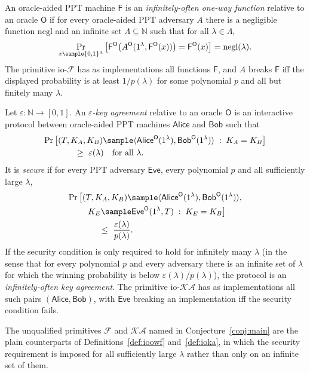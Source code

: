 \documentclass{conjura-conjecture}
\newcommand{\bits}{\{0,1\}}
\newcommand{\negl}{\mathrm{negl}}
\newcommand{\iopref}{\mathrm{io}\text{-}}
\newcommand{\Fc}{\mathcal{F}}
\newcommand{\KAc}{\mathcal{KA}}
\newcommand{\ioF}{\iopref\Fc}
\newcommand{\ioKA}{\iopref\KAc}
\newcommand{\Oc}{\mathsf{O}}
\newcommand{\Fs}{\mathsf{F}}
\newcommand{\Alice}{\mathsf{Alice}}
\newcommand{\Bob}{\mathsf{Bob}}
\newcommand{\Eve}{\mathsf{Eve}}
\newcommand{\FO}{\Fs^{\Oc}}
\newcommand{\kaexec}{\langle\Alice^{\Oc}(1^{\lambda}),\Bob^{\Oc}(1^{\lambda})\rangle}
\begin{document}
\begin{definition}\label{def:ioowf}
An oracle-aided PPT machine $\Fs$ is an \emph{infinitely-often one-way
function} relative to an oracle $\Oc$ if for every oracle-aided PPT
adversary $A$ there is a negligible function $\negl$ and an infinite set
$\Lambda\subseteq\mathbb N$ such that for all $\lambda\in\Lambda$,
\[
  \Pr_{x\sample\bits^{\lambda}}
    \big[\FO\big(A^{\Oc}(1^{\lambda},\FO(x))\big)=\FO(x)\big]
  =\negl(\lambda).
\]
The primitive $\ioF$ has as implementations all functions $\Fs$, and $A$
breaks $\Fs$ iff the displayed probability is at least $1/p(\lambda)$ for
some polynomial $p$ and all but finitely many $\lambda$.
\end{definition}

\begin{definition}\label{def:ioka}
Let $\varepsilon:\mathbb N\to[0,1]$. An \emph{$\varepsilon$-key
agreement} relative to an oracle $\Oc$ is an interactive protocol between
oracle-aided PPT machines $\Alice$ and $\Bob$ such that
\begin{align*}
  \Pr\big[&(T,K_A,K_B)\sample\kaexec \;:\; K_A=K_B\big]\\
    &\qquad\ge\ \varepsilon(\lambda)\quad\text{for all }\lambda .
\end{align*}
It is \emph{secure} if for every PPT adversary $\Eve$, every polynomial
$p$ and all sufficiently large $\lambda$,
\begin{align*}
  \Pr\big[&(T,K_A,K_B)\sample\kaexec,\\
    &\ \ K_E\sample\Eve^{\Oc}(1^{\lambda},T)\;:\;K_E=K_B\big]\\
    &\qquad\le\ \frac{\varepsilon(\lambda)}{p(\lambda)} .
\end{align*}
If the security condition is only required to hold for infinitely many
$\lambda$ (in the sense that for every polynomial $p$ and every adversary
there is an infinite set of $\lambda$ for which the winning probability
is below $\varepsilon(\lambda)/p(\lambda)$), the protocol is an
\emph{infinitely-often key agreement}. The primitive $\ioKA$ has as
implementations all such pairs $(\Alice,\Bob)$, with $\Eve$ breaking an
implementation iff the security condition fails.
\end{definition}

The unqualified primitives $\Fc$ and $\KAc$ named in
Conjecture~\ref{conj:main} are the plain counterparts of
Definitions~\ref{def:ioowf} and~\ref{def:ioka}, in which the security
requirement is imposed for all sufficiently large $\lambda$ rather than
only on an infinite set of them.
\end{document}
